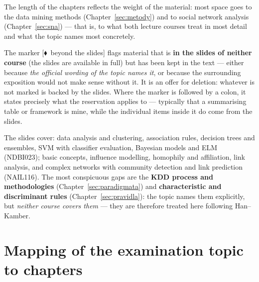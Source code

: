 \documentclass[11pt,a4paper]{article}
\theoremstyle{definition}
\newcommand{\mimo}{\textcolor{markcol}{\textsf{\footnotesize[$\blacklozenge$~beyond the slides]}}}
\begin{document}
\begin{center}
\begin{minipage}{0.92\textwidth}
\begin{poznbox}
\small
The length of the chapters reflects the weight of the material: most space goes to the
data mining methods (Chapter~\ref{sec:metody}) and to social network analysis
(Chapter~\ref{sec:sna}) --- that is, to what both lecture courses treat in most detail and what
the topic names most concretely.

The marker \mimo{} flags material that is \textbf{in the slides of neither course} (the slides
are available in full) but has been kept in the text --- either because \emph{the official
wording of the topic names it}, or because the surrounding exposition would not make sense
without it. It is an offer for deletion: whatever is not marked is backed by the slides. Where
the marker is followed by a colon, it states precisely what the reservation applies to ---
typically that a summarising table or framework is mine, while the individual items inside it do
come from the slides.

The slides cover: data analysis and clustering, association rules, decision trees and
ensembles, SVM with classifier evaluation, Bayesian models and ELM (NDBI023); basic concepts,
influence modelling, homophily and affiliation, link analysis, and complex networks with
community detection and link prediction (NAIL116). The most conspicuous gaps are the
\textbf{KDD process and methodologies} (Chapter~\ref{sec:paradigmata}) and
\textbf{characteristic and discriminant rules} (Chapter~\ref{sec:pravidla}): the topic names
them explicitly, but \emph{neither course covers them} --- they are therefore treated here
following Han--Kamber.
\end{poznbox}
\end{minipage}
\end{center}

\vspace{2mm}

\section*{Mapping of the examination topic to chapters}
\end{document}
